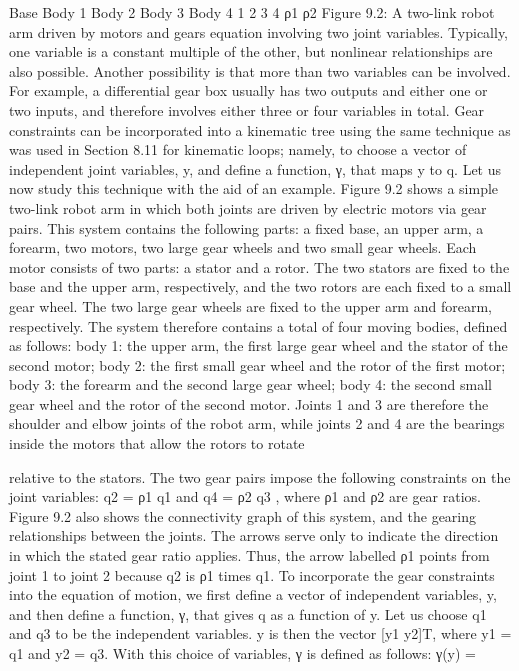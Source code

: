 Base Body 1 Body 2 Body 3 Body 4 1 2 3 4 ρ1 ρ2 Figure 9.2: A two-link robot arm driven by motors and gears equation involving two joint variables. Typically, one variable is a constant multiple of the other, but nonlinear relationships are also possible. Another possibility is that more than two variables can be involved. For example, a differential gear box usually has two outputs and either one or two inputs, and therefore involves either three or four variables in total. Gear constraints can be incorporated into a kinematic tree using the same technique as was used in Section 8.11 for kinematic loops; namely, to choose a vector of independent joint variables, y, and define a function, γ, that maps y to q. Let us now study this technique with the aid of an example. Figure 9.2 shows a simple two-link robot arm in which both joints are driven by electric motors via gear pairs. This system contains the following parts: a fixed base, an upper arm, a forearm, two motors, two large gear wheels and two small gear wheels. Each motor consists of two parts: a stator and a rotor. The two stators are fixed to the base and the upper arm, respectively, and the two rotors are each fixed to a small gear wheel. The two large gear wheels are fixed to the upper arm and forearm, respectively. The system therefore contains a total of four moving bodies, defined as follows: body 1: the upper arm, the first large gear wheel and the stator of the second motor; body 2: the first small gear wheel and the rotor of the first motor; body 3: the forearm and the second large gear wheel; body 4: the second small gear wheel and the rotor of the second motor. Joints 1 and 3 are therefore the shoulder and elbow joints of the robot arm, while joints 2 and 4 are the bearings inside the motors that allow the rotors to rotate

relative to the stators. The two gear pairs impose the following constraints on the joint variables: q2 = ρ1 q1 and q4 = ρ2 q3 , where ρ1 and ρ2 are gear ratios. Figure 9.2 also shows the connectivity graph of this system, and the gearing relationships between the joints. The arrows serve only to indicate the direction in which the stated gear ratio applies. Thus, the arrow labelled ρ1 points from joint 1 to joint 2 because q2 is ρ1 times q1. To incorporate the gear constraints into the equation of motion, we first define a vector of independent variables, y, and then define a function, γ, that gives q as a function of y. Let us choose q1 and q3 to be the independent variables. y is then the vector [y1 y2]T, where y1 = q1 and y2 = q3. With this choice of variables, γ is defined as follows: γ(y) =

